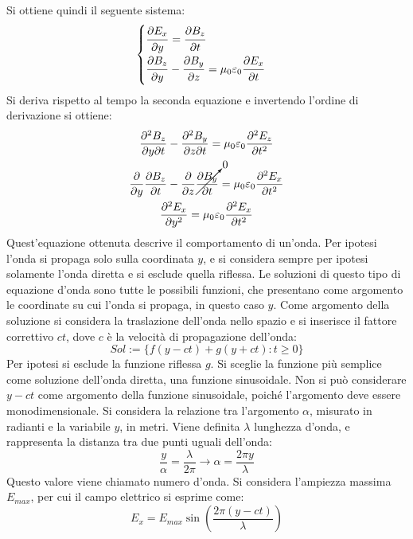 \documentclass{article}
\numberwithin{equation}{subsection}
\begin{document}
Si ottiene quindi il seguente sistema:
\begin{equation*}
    \begin{cases}
        \displaystyle\frac{\strut \partial E_x}{\strut \partial y}=\frac{\strut \partial B_z}{\strut \partial t}\\
        \displaystyle\frac{\strut \partial B_z}{\strut \partial y}-\frac{\strut \partial B_y}{\strut \partial z}=\mu_0\varepsilon_0\frac{\strut \partial E_x}{\strut \partial t}
    \end{cases}
\end{equation*}
Si deriva rispetto al tempo la seconda equazione e invertendo l'ordine di derivazione si ottiene:
\begin{gather*}
    \displaystyle\frac{\partial^2B_z}{\partial y\partial t}-\frac{\partial^2B_y}{\partial z\partial t}=\mu_0\varepsilon_0\frac{\partial^2E_z}{\partial t^2}\\
    \displaystyle\frac{\partial}{\partial y}\frac{\partial B_z}{\partial t}-\frac{\partial}{\partial z}\cancelto{0}{\frac{\partial B_y}{\partial t}}=\mu_0\varepsilon_0\frac{\partial^2E_x}{\partial t^2}\\
    \displaystyle\frac{\partial^2E_x}{\partial y^2}=\mu_0\varepsilon_0\frac{\partial^2E_x}{\partial t^2}
\end{gather*}
Quest'equazione ottenuta descrive il comportamento di un'onda. Per ipotesi l'onda si propaga solo sulla coordinata $y$, e si considera sempre per ipotesi solamente l'onda 
diretta e si esclude quella riflessa. Le soluzioni di questo tipo di equazione d'onda sono tutte le possibili funzioni, che presentano come argomento le coordinate su cui 
l'onda si propaga, in questo caso $y$. Come argomento della soluzione si considera la traslazione dell'onda nello spazio e si inserisce il fattore correttivo $ct$, dove 
$c$ è la velocità di propagazione dell'onda:
\begin{equation*}
    Sol:=\{f(y-ct)+g(y+ct):t\geq0\}
\end{equation*}  
Per ipotesi si esclude la funzione riflessa $g$. Si sceglie la funzione più semplice come soluzione dell'onda diretta, una funzione sinusoidale. Non si può considerare $y-ct$ 
come argomento della funzione sinusoidale, poiché l'argomento deve essere monodimensionale. Si considera la relazione tra l'argomento $\alpha$, misurato in radianti e la 
variabile $y$, in metri. Viene definita $\lambda$ lunghezza d'onda, e rappresenta la distanza tra due punti uguali dell'onda: 
\begin{equation*}
    \displaystyle\frac{y}{\alpha}=\frac{\lambda}{2\pi}\to\alpha=\frac{2\pi y}{\lambda}
\end{equation*}
Questo valore viene chiamato numero d'onda. Si considera l'ampiezza massima $E_{max}$, per cui il campo elettrico si esprime come:
\begin{equation}
    E_x=E_{max}\sin\left(\displaystyle\frac{2\pi (y-ct)}{\lambda}\right)
\end{equation}
\end{document}
